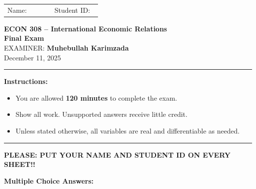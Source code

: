 \documentclass[12pt]{article}
\begin{document}

\begin{center}
\begin{tabular}{p{0.45\linewidth}p{0.45\linewidth}}
Name:\hrulefill & Student ID:\hrulefill \\
\end{tabular}

\vspace{2em}

\Large \textbf{ECON 308 -- International Economic Relations} \\[0.5em]
\large \textbf{Final Exam} \\[1em]

\normalsize EXAMINER: \textbf{Muhebullah Karimzada} \\[0.5em]
December 11, 2025
\end{center}



\hrule
\vspace{2em}
\textbf{Instructions:}
\begin{itemize}
\item You are allowed \textbf{120 minutes} to complete the exam.
    \item Show all work. Unsupported answers receive little credit.

    \item Unless stated otherwise, all variables are real and differentiable as needed.
\end{itemize}

\hrule

\vspace{1em}

\textbf{PLEASE: PUT YOUR NAME AND STUDENT ID ON EVERY SHEET!!}

\vspace{2em}

\textbf{Multiple Choice Answers:}

\vspace{0.8em}


\setlength{\tabcolsep}{18pt}
\end{document}
